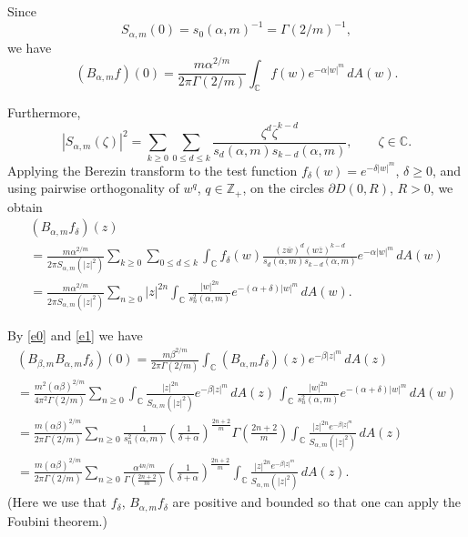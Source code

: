 \documentclass[12pt]{amsart}
\numberwithin{equation}{section}
\theoremstyle{plain}
\numberwithin{equation}{section}
\begin{document}
Since 
$$
S_{\alpha,m}(0)=s_0(\alpha,m)^{-1}= \Gamma(2/m)^{-1},
$$
we have
\begin{equation}
(B_{\alpha,m}f)(0)=\frac{m\alpha^{2/m}}{2\pi\Gamma(2/m)}  \int_{\mathbb C}f(w) e^{-\alpha |w|^m}\,dA(w).
\label{e0}
\end{equation}

Furthermore, 
$$
|S_{\alpha,m}(\zeta)|^2=\sum_{k\ge 0}\sum_{0\le d\le k}\frac{\zeta^d\overline{\zeta}^{k-d}}{s_d(\alpha,m)s_{k-d}(\alpha,m)},\qquad \zeta\in\mathbb C.
$$
Applying the Berezin transform to the test function $f_{\delta}(w)=e^{-\delta|w|^{m}}$, $\delta\ge 0$, and using pairwise orthogonality of $w^q$, $q\in\mathbb Z_+$, on the circles $\partial D(0,R)$, $R>0$, we obtain 
\begin{multline}
(B_{\alpha,m}f_\delta)(z)\\= 
\frac{m\alpha^{2/m}}{2\pi S_{\alpha,m}(|z|^2)}  \sum_{k\ge 0} 
\sum_{0\le d\le k}\int_{\mathbb C}f_\delta(w)  
\frac{(z\overline{w})^d(w\overline{z})^{k-d}}{s_{d}(\alpha,m)s_{k-d}(\alpha,m)} e^{-\alpha |w|^m}\,dA(w) \\
 =   \frac{m\alpha^{2/m}}{2\pi S_{\alpha,m}(|z|^2)}\sum_{n\ge 0} |z|^{2n}  \int_{\mathbb C}
\frac{ |w|^{2n} }{s_n^2(\alpha,m)}     e^{-(\alpha+\delta) |w|^m}\,dA(w).\label{e1}
\end{multline}


By \eqref{e0} and \eqref{e1} we have 
\begin{multline*}
(B_{\beta,m}B_{\alpha,m}f_\delta)(0) = \frac{m\beta^{2/m}}{2\pi\Gamma(2/m)}   \int_{\mathbb C}  (B_{\alpha,m}f_\delta)(z) e^{-\beta |z|^m}\,dA(z)\\
=  \frac{m^2 (\alpha\beta)^{2/m} }{4\pi^2\Gamma(2/m)}   \sum_{n\ge 0}   \int_{\mathbb C} \frac{|z|^{2n}}{S_{\alpha,m}(|z|^2)}e^{-\beta |z|^m}\,dA(z)\,\int_{\mathbb C}  
\frac{ |w|^{2n}}{s_n^2(\alpha,m)} e^{-(\alpha + \delta)|w|^m}  \,dA(w) \\
= \frac{m (\alpha\beta)^{2/m} }{2\pi\Gamma(2/m)}  \sum_{n\ge 0} \frac1{s_n^2(\alpha,m)}   \left(\frac{1}{\delta+\alpha}\right)^{\frac{2n+2}{m}}\Gamma\left(\frac{2n+2}{m} \right)\int_{\mathbb C}  \frac{  |z|^{2n} e^{-  \beta |z|^m}  }{ S_{\alpha,m}(|z|^2)}  \,  dA(z)\\
 =    \frac{m (\alpha\beta)^{2/m} }{2\pi\Gamma(2/m)} \sum_{n\ge 0}  
  \frac{ \alpha^{4n/m}}{\Gamma\left(\frac{2n+2}{m} \right)}   \left(\frac{1}{\delta+\alpha}\right)^{\frac{2n+2}{m}}\int_{\mathbb C}  \frac{  |z|^{2n} e^{-  \beta |z|^m}  }{ S_{\alpha,m}(|z|^2)}  \,dA(z).
\end{multline*}
(Here we use that $f_\delta$, $B_{\alpha,m}f_\delta$ are positive and bounded so that one can apply the Foubini theorem.)
\end{document}

